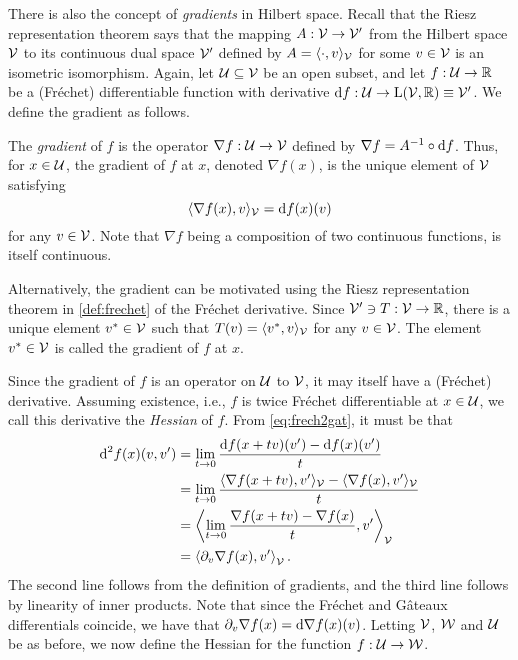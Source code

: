 There is also the concept of \emph{gradients} in Hilbert space.
Recall that the Riesz representation theorem says that the mapping $A:{\mathcal V}\to{\mathcal V}'$ from the Hilbert space ${\mathcal V}$ to its continuous dual space ${\mathcal V}'$ defined by $A = \langle\cdot,v\rangle_{\mathcal V}$ for some $v\in{\mathcal V}$ is an isometric isomorphism.
Again, let ${\mathcal U} \subseteq {\mathcal V}$ be an open subset, and let $f:{\mathcal U}\to\mathbb{R}$ be a (Fréchet) differentiable function with derivative $\text{d} f: {\mathcal U} \to \text{L}({\mathcal V},\mathbb{R}) \equiv {\mathcal V}'$.
We define the gradient as follows.

\begin{definition}
  The \emph{gradient} of $f$ is the operator $\nabla f: {\mathcal U} \to {\mathcal V}$ defined by $\nabla f = A^{-1} \circ \text{d} f$.
  Thus, for $x \in {\mathcal U}$, the gradient of $f$ at $x$, denoted $\nabla f(x)$, is the unique element of ${\mathcal V}$ satisfying
  \[
    \langle\nabla f(x), v\rangle_{\mathcal V} = \text{d} f(x)(v)
  \]
  for any $v \in {\mathcal V}$.
  Note that $\nabla f$ being a composition of two continuous functions, is itself continuous.
\end{definition}

\begin{remark}
  Alternatively, the gradient can be motivated using the Riesz representation theorem in \cref{def:frechet} of the Fréchet derivative.
  Since ${\mathcal V}'\ni T:{\mathcal V}\to\mathbb{R}$, there is a unique element $v^*\in{\mathcal V}$ such that $T(v)=\langle v^*,v\rangle_{\mathcal V}$ for any $v\in{\mathcal V}$.
  The element $v^*\in{\mathcal V}$ is called the gradient of $f$ at $x$.
\end{remark}

Since the gradient of $f$ is an operator on ${\mathcal U}$ to ${\mathcal V}$, it may itself have a (Fréchet) derivative.
Assuming existence, i.e., $f$ is twice Fréchet differentiable at $x \in {\mathcal U}$, we call this derivative the \emph{Hessian} of $f$.
From \cref{eq:frech2gat}, it must be that
\begin{align*}
  \d^2 f(x)(v,v') &= \lim_{t\to 0} \frac{\d f(x + t v)(v') - \d f(x)(v')}{t} \\
  &= \lim_{t\to 0} \frac{\ip{\nabla f(x+tv), v'}_\cV - \ip{\nabla f(x), v'}_\cV}{t} \\
  &= \left\langle \lim_{t\to 0} \frac{\nabla f(x+tv) - \nabla f(x)}{t} , v' \right\rangle_\cV \\%
  &= \left\langle \partial_v \nabla f(x) , v' \right\rangle_\cV.
\end{align*}
The second line follows from the definition of gradients, and the third line follows by linearity of inner products.
Note that since the Fréchet and Gâteaux differentials coincide, we have that $\partial_v \nabla f(x) = \text{d} \nabla f(x) (v)$.
Letting ${\mathcal V}$, ${\mathcal W}$ and ${\mathcal U}$ be as before, we now define the Hessian for the function $f:{\mathcal U} \to {\mathcal W}$.

